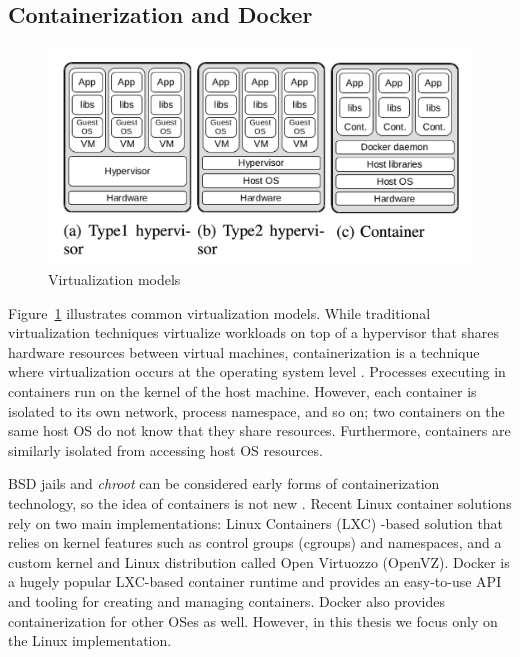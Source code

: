 \documentclass[english, 12pt, a4paper, sci, utf8, a-2b, online]{aaltothesis}
\begin{document}
\subsection{Containerization and Docker}

\begin{figure}[h!]
  \centering
  \includegraphics[width=\linewidth]{files/figure-1.png}
  \caption{Virtualization models \cite{combe2016docker}} %
  \label{figure-1}
\end{figure}

Figure~\ref{figure-1} illustrates common virtualization models. While traditional virtualization techniques virtualize workloads on top of a hypervisor that shares hardware resources between virtual machines, containerization is a technique where virtualization occurs at the operating system level \cite{merkel2014docker}. Processes executing in containers run on the kernel of the host machine. However, each container is isolated to its own network, process namespace, and so on; two containers on the same host OS do not know that they share resources. Furthermore, containers are similarly isolated from accessing host OS resources.

BSD jails and \textit{chroot} can be considered early forms of containerization technology, so the idea of containers is not new \cite{combe2016docker}. Recent Linux container solutions rely on two main implementations: Linux Containers (LXC) -based solution that relies on kernel features such as control groups (cgroups) and namespaces, and a custom kernel and Linux distribution called Open Virtuozzo (OpenVZ). Docker \cite{docker} is a hugely popular LXC-based container runtime and provides an easy-to-use API and tooling for creating and managing containers. Docker also provides containerization for other OSes as well. However, in this thesis we focus only on the Linux implementation.
\end{document}

